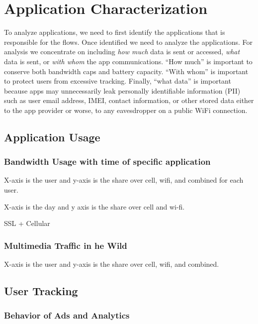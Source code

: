 \section{Application Characterization}
\label{sec:characterize-app}

To analyze applications, we need to first identify the applications that is responsible for the flows. 
Once identified we need to analyze the applications. 
For analysis we concentrate on including {\it how much} data is sent or accessed, {\it what} data is sent,  or {\it with whom} the app communications.
``How much'' is important to conserve both bandwidth caps and battery capacity.
``With whom'' is important to protect users from excessive tracking.
Finally, ``what data'' is important because apps may unnecessarily leak personally identifiable information (PII) such as user email address, IMEI, contact information, or other stored data either to the app provider or worse, to any eavesdropper on a public WiFi connection.

\subsection{Application Usage}


\subsubsection{Bandwidth Usage with time of specific application}

X-axis is the user and y-axis is the share over cell, wifi, and combined for each user.

X-axis is the day and y axis is the share over cell and wi-fi.

SSL + Cellular 

\subsubsection{Multimedia Traffic in he Wild}

X-axis is the user and y-axis is the share over cell, wifi, and combined.

\subsection{User Tracking}

\subsubsection{Behavior of Ads and Analytics}


